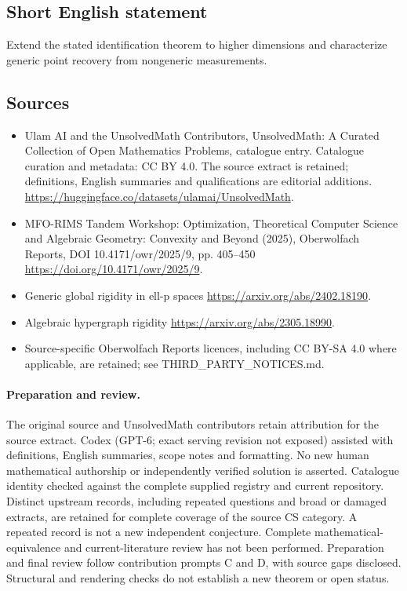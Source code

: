 \documentclass[11pt]{article}
\begin{document}
\subsection{Short English statement}
Extend the stated identification theorem to higher dimensions and characterize generic point recovery from nongeneric measurements.
\subsection{Sources}
\begin{itemize}
\item[\hypertarget{source:statement:1}{S1}] Ulam AI and the UnsolvedMath Contributors, UnsolvedMath: A Curated Collection of Open Mathematics Problems, catalogue entry. Catalogue curation and metadata: CC BY 4.0. The source extract is retained; definitions, English summaries and qualifications are editorial additions.
\url{https://huggingface.co/datasets/ulamai/UnsolvedMath}.
\item[\hypertarget{source:statement:2}{S2}] MFO-RIMS Tandem Workshop: Optimization, Theoretical Computer Science and Algebraic Geometry: Convexity and Beyond (2025), Oberwolfach Reports, DOI 10.4171/owr/2025/9, pp. 405--450
\url{https://doi.org/10.4171/owr/2025/9}.
\item[\hypertarget{source:statement:3}{S3}] Generic global rigidity in ell-p spaces
\url{https://arxiv.org/abs/2402.18190}.
\item[\hypertarget{source:statement:4}{S4}] Algebraic hypergraph rigidity
\url{https://arxiv.org/abs/2305.18990}.
\item Source-specific Oberwolfach Reports licences, including CC BY-SA 4.0 where applicable, are retained; see THIRD\_PARTY\_NOTICES.md.
\end{itemize}
\paragraph{Preparation and review.}
The original source and UnsolvedMath contributors retain attribution for the source extract. Codex (GPT-6; exact serving revision not exposed) assisted with definitions, English summaries, scope notes and formatting. No new human mathematical authorship or independently verified solution is asserted. Catalogue identity checked against the complete supplied registry and current repository. Distinct upstream records, including repeated questions and broad or damaged extracts, are retained for complete coverage of the source CS category. A repeated record is not a new independent conjecture. Complete mathematical-equivalence and current-literature review has not been performed. Preparation and final review follow contribution prompts C and D, with source gaps disclosed. Structural and rendering checks do not establish a new theorem or open status.
\label{end:statement}
\end{document}

